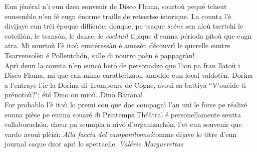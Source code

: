 \newline
\newline
\og Eun jénéral n'i eun dzen souvenir de Disco Flama, sourtoù pequé tcheut eunsemblo n'en fé eugn énorme traille de retsertse i\-storique. La counta l'è divijaye eun trèi époque diffiente; donque, pe tsaque \textit{scène} sen aloù tsertchì le coteill\'on, le tsans\'on, le danse, le \textit{cocktail} tipique d'eunna périoda pitoù que eugn atra. Mi sourtoù l'è itoù euntéressàn é amezèn découvrì le querelle euntre Tsarvensolèn é Pollentch\'on, salle di noutro paèn é pappagràn!
\\ Aprì deun la counta n'en eunc\'o bet\'o de personadzo que l'ion pa fran llatoù i Disco Flama, mi que can mimo carattérizaon amoddo eun local valdotèn. Dorina a l'entraye l'ie la Dorina di Trompeurs de Cogne, avouì sa battiya ``V'ouèide-ti prénotoù?"; ét\'o Dino ou mioù\ldots Dino Banana!
\\ For probablo l'è itoù lo premì cou que doe compagnì l'an unì le forse pe réalizé eunna pièse pe eunna souaré di Printemps Thé\^atral é personellamente seutta collaborach\'on, cheur pa seumpla a niv\'o d'organizach\'on, l'et eun souvenir que vardo avouì plèizì: \og\textit{Alla faccia del campanilismo!}\fg comme dijave lo titre d'eun journal caque dzor aprì lo spettaclle.\fg{}
\newline
\newline
\hspace*{\fill} \textit{Valérie Marguerettaz}
